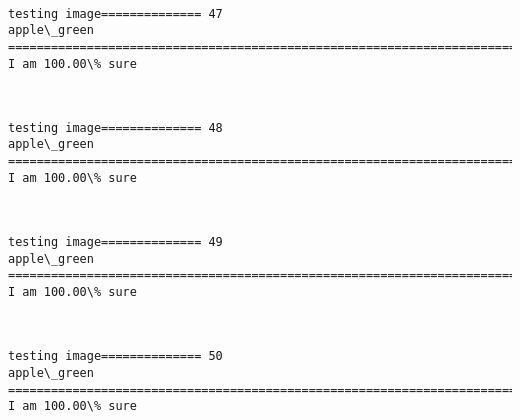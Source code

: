 \documentclass[11pt]{article}
\begin{document}
    \begin{center}
    \end{center}
    { \hspace*{\fill} \\}
    
    \begin{Verbatim}[commandchars=\\\{\}]
testing image============== 47
apple\_green
============================================================================
I am 100.00\% sure

    \end{Verbatim}

    \begin{center}
    \end{center}
    { \hspace*{\fill} \\}
    
    \begin{Verbatim}[commandchars=\\\{\}]
testing image============== 48
apple\_green
============================================================================
I am 100.00\% sure

    \end{Verbatim}

    \begin{center}
    \end{center}
    { \hspace*{\fill} \\}
    
    \begin{Verbatim}[commandchars=\\\{\}]
testing image============== 49
apple\_green
============================================================================
I am 100.00\% sure

    \end{Verbatim}

    \begin{center}
    \end{center}
    { \hspace*{\fill} \\}
    
    \begin{Verbatim}[commandchars=\\\{\}]
testing image============== 50
apple\_green
============================================================================
I am 100.00\% sure

    \end{Verbatim}
\end{document}
